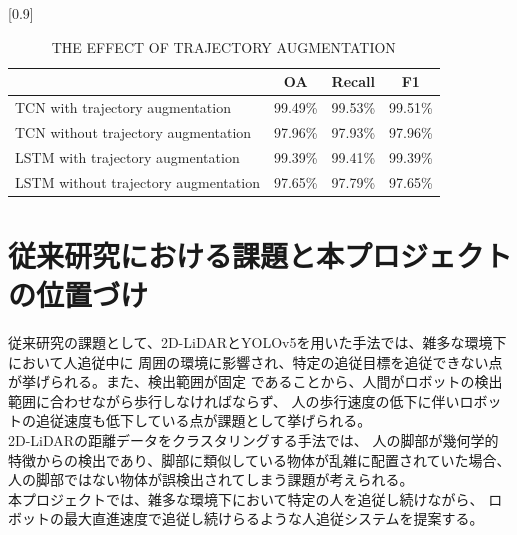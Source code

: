 \begin{table}[b]
  \begin{center}
    \caption{{THE EFFECT OF TRAJECTORY AUGMENTATION\cite{Temporal convolutional networks for multi-person activity recognition using a 2D LIDAR}}
    \label{2-2_THE EFFECT OF TRAJECTORY AUGMENTATION}}
    \scalebox{1.0}[0.9]{
      \begin{tabular}{l|c|c|c} \hline
        & OA & Recall & F1 \\ \hline
        TCN with trajectory augmentation & 99.49\% & 99.53\% & 99.51\% \\ \hline
        TCN without trajectory augmentation & 97.96\% & 97.93\% & 97.96\% \\ \hline
        LSTM with trajectory augmentation & 99.39\% & 99.41\% & 99.39\% \\ \hline
        LSTM without trajectory augmentation & 97.65\% & 97.79\% & 97.65\% \\ \hline
      \end{tabular}
    }
  \end{center}
\end{table}

\clearpage

\section{従来研究における課題と本プロジェクトの位置づけ}
従来研究の課題として、2D-LiDARとYOLOv5を用いた手法では、雑多な環境下において人追従中に
周囲の環境に影響され、特定の追従目標を追従できない点が挙げられる。また、検出範囲が固定
であることから、人間がロボットの検出範囲に合わせながら歩行しなければならず、
人の歩行速度の低下に伴いロボットの追従速度も低下している点が課題として挙げられる。\\ \indent
2D-LiDARの距離データをクラスタリングする手法では、
人の脚部が幾何学的特徴からの検出であり、脚部に類似している物体が乱雑に配置されていた場合、
人の脚部ではない物体が誤検出されてしまう課題が考えられる。\\ \indent
本プロジェクトでは、雑多な環境下において特定の人を追従し続けながら、
ロボットの最大直進速度で追従し続けらるような人追従システムを提案する。